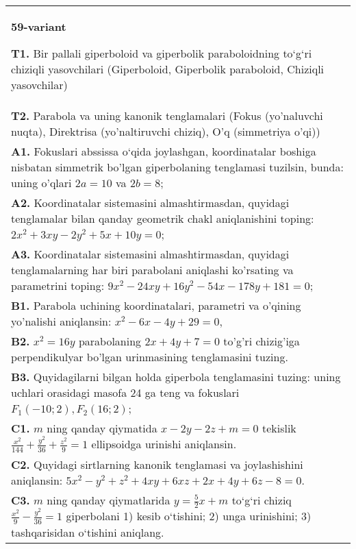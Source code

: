 \documentclass{article}
\begin{document}
\begin{tabular}{m{17cm}}
\textbf{59-variant}
\newline

\textbf{T1.} Bir pallali giperboloid va giperbolik paraboloidning to‘g‘ri chiziqli yasovchilari (Giperboloid, Giperbolik paraboloid, Chiziqli yasovchilar) \\
\textbf{T2.} Parabola va uning kanonik tenglamalari (Fokus (yo’naluvchi nuqta), Direktrisa (yo’naltiruvchi chiziq), O’q (simmetriya o’qi)) \\
\textbf{A1.} Fokuslari abssissa o‘qida joylashgan, koordinatalar boshiga nisbatan simmetrik bo'lgan giperbolaning tenglamasi tuzilsin, bunda: uning o'qlari $2 a=10$ va $2 b=8$; \\
\textbf{A2.} Koordinatalar sistemasini almashtirmasdan, quyidagi tenglamalar bilan qanday geometrik chakl aniqlanishini toping: $2 x^2+3 x y-2 y^2+5 x+10 y=0$; \\
\textbf{A3.} Koordinatalar sistemasini almashtirmasdan, quyidagi tenglamalarning har biri parabolani aniqlashi ko'rsating va parametrini toping: $9 x^2-24 x y+16 y^2-54 x-178 y+181=0$; \\
\textbf{B1.} Parabola uchining koordinatalari, parametri va o'qining yo'nalishi aniqlansin: $x^2-6 x-4 y+29=0$, \\
\textbf{B2.} $x^2=16y$ parabolaning $2x+4y+7=0$ to'g'ri chizig'iga perpendikulyar bo'lgan urinmasining tenglamasini tuzing. \\
\textbf{B3.} Quyidagilarni bilgan holda giperbola tenglamasini tuzing: uning uchlari orasidagi masofa 24 ga teng va fokuslari $F_1 (-10; 2), F_2 (16; 2) $; \\
\textbf{C1.} $m$ ning qanday qiymatida $x-2 y-2 z+m=0$ tekislik $\frac{x^2}{144}+\frac{y^2}{36}+\frac{z^2}{9}=1$ ellipsoidga urinishi aniqlansin. \\
\textbf{C2.} Quyidagi sirtlarning kanonik tenglamasi va joylashishini aniqlansin: $5 x^2-y^2+z^2+4 x y+6 x z+2 x+4 y+6 z-8=0$. \\
\textbf{C3.} $m$ ning qanday qiymatlarida $y=\frac{5}{2} x+m$ to‘g‘ri chiziq $\frac{x^2}{9}-\frac{y^2}{36}=1$ giperbolani 1) kesib o‘tishini; 2) unga urinishini; 3) tashqarisidan o‘tishini aniqlang. \\

\end{tabular}
\vspace{1cm}
\end{document}
